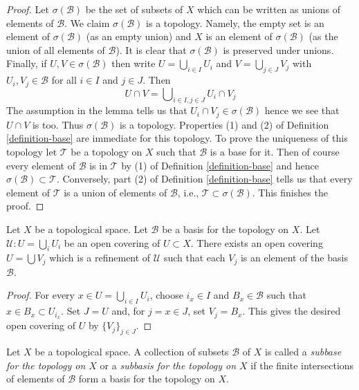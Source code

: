 \begin{proof}
Let $\sigma(\mathcal B)$ be the set of subsets of $X$ which can be written
as unions of elements of $\mathcal B$. We claim $\sigma(\mathcal{B})$
is a topology. Namely, the empty set is an element of $\sigma(\mathcal{B})$
(as an empty union) and $X$ is an element of $\sigma(\mathcal{B})$ (as the
union of all elements of $\mathcal{B}$). It is clear that $\sigma(\mathcal{B})$
is preserved under unions. Finally, if $U, V \in \sigma(\mathcal{B})$
then write $U = \bigcup_{i \in I} U_i$ and $V = \bigcup_{j \in J} V_j$
with $U_i, V_j \in \mathcal{B}$ for all $i \in I$ and $j \in J$.
Then
$$
U \cap V = \bigcup\nolimits_{i \in I, j \in J}
U_i \cap V_j
$$
The assumption in the lemma tells us that $U_i \cap V_j \in \sigma(\mathcal{B})$
hence we see that $U \cap V$ is too. Thus $\sigma(\mathcal{B})$ is a topology.
Properties (1) and (2) of Definition \ref{definition-base} are
immediate for this topology. To prove the uniqueness of this topology
let $\mathcal T$ be a topology on $X$ such that $\mathcal B$ is a base for it.
Then of course every element of $\mathcal{B}$ is in $\mathcal{T}$ by
(1) of Definition \ref{definition-base} and
hence $\sigma(\mathcal{B}) \subset \mathcal{T}$. Conversely, part
(2) of Definition \ref{definition-base} tells us that every element
of $\mathcal{T}$ is a union of elements of $\mathcal{B}$, i.e.,
$\mathcal{T} \subset \sigma(\mathcal{B})$. This finishes the proof.
\end{proof}

\begin{lemma}
\label{lemma-refine-covering-basis}
Let $X$ be a topological space.
Let $\mathcal{B}$ be a basis for the topology on $X$.
Let $\mathcal{U} : U = \bigcup_i U_i$ be an open covering of
$U \subset X$. There exists an open covering $U = \bigcup V_j$
which is a refinement of $\mathcal{U}$ such that each
$V_j$ is an element of the basis $\mathcal{B}$.
\end{lemma}

\begin{proof}
For every $x \in U = \bigcup_{i \in I} U_i$, choose $i_x \in I$ and
$B_x \in \mathcal{B}$ such that $x \in B_x \subset U_{i_x}$.
Set $J = U$ and, for $j = x \in J$, set $V_j = B_x$.
This gives the desired open covering of $U$ by $\{V_j\}_{j \in J}$.
\end{proof}

\begin{definition}
\label{definition-subbase}
Let $X$ be a topological space. A collection of subsets $\mathcal{B}$ of $X$
is called a {\it subbase for the topology on $X$} or a {\it subbasis for the
topology on $X$} if the finite intersections of
elements of $\mathcal{B}$ form a basis for the topology on $X$.
\end{definition}

